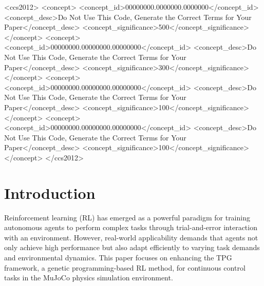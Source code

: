 \documentclass[sigconf]{acmart}
\begin{document}
\begin{CCSXML}
<ccs2012>
 <concept>
  <concept_id>00000000.0000000.0000000</concept_id>
  <concept_desc>Do Not Use This Code, Generate the Correct Terms for Your Paper</concept_desc>
  <concept_significance>500</concept_significance>
 </concept>
 <concept>
  <concept_id>00000000.00000000.00000000</concept_id>
  <concept_desc>Do Not Use This Code, Generate the Correct Terms for Your Paper</concept_desc>
  <concept_significance>300</concept_significance>
 </concept>
 <concept>
  <concept_id>00000000.00000000.00000000</concept_id>
  <concept_desc>Do Not Use This Code, Generate the Correct Terms for Your Paper</concept_desc>
  <concept_significance>100</concept_significance>
 </concept>
 <concept>
  <concept_id>00000000.00000000.00000000</concept_id>
  <concept_desc>Do Not Use This Code, Generate the Correct Terms for Your Paper</concept_desc>
  <concept_significance>100</concept_significance>
 </concept>
</ccs2012>
\end{CCSXML}





\maketitle

\section{Introduction}
Reinforcement learning (RL) has emerged as a powerful paradigm for training autonomous agents to perform complex tasks through trial-and-error interaction with an environment. However, real-world applicability demands that agents not only achieve high performance but also adapt efficiently to varying task demands and environmental dynamics. This paper focuses on enhancing the TPG framework, a genetic programming-based RL method, for continuous control tasks in the MuJoCo physics simulation environment.
\end{document}
